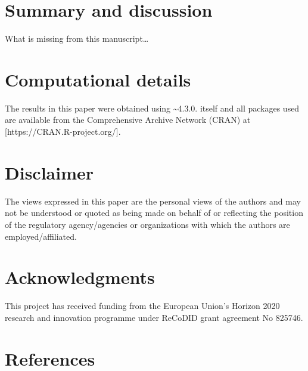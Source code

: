 \documentclass[
  article]{jss}
\newlength{\cslhangindent}
\newlength{\cslentryspacingunit} %
\newenvironment{CSLReferences}[2] %
 {%
  \setlength{\parindent}{0pt}
  \ifodd #1
  \let\oldpar\par
  \def\par{\hangindent=\cslhangindent\oldpar}
  \fi
  \setlength{\parskip}{#2\cslentryspacingunit}
 }%
 {}
\begin{document}
\hypertarget{sec-summary}{%
\section{Summary and discussion}\label{sec-summary}}

What is missing from this manuscript\ldots{}

\hypertarget{computational-details}{%
\section*{Computational details}\label{computational-details}}

The results in this paper were obtained using
\textasciitilde4.3.0.  itself and all packages
used are available from the Comprehensive  Archive Network
(CRAN) at {[}https://CRAN.R-project.org/{]}.

\hypertarget{disclaimer}{%
\section{Disclaimer}\label{disclaimer}}

The views expressed in this paper are the personal views of the authors
and may not be understood or quoted as being made on behalf of or
reflecting the position of the regulatory agency/agencies or
organizations with which the authors are employed/affiliated.

\hypertarget{acknowledgments}{%
\section*{Acknowledgments}\label{acknowledgments}}

This project has received funding from the European Union's Horizon 2020
research and innovation programme under ReCoDID grant agreement No
825746.

\hypertarget{references}{%
\section*{References}\label{references}}

\hypertarget{refs}{}
\begin{CSLReferences}{0}{0}
\end{CSLReferences}

\newpage{}
\end{document}

